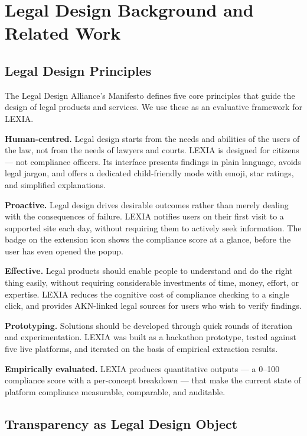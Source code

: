 \documentclass[12pt, a4paper]{article}
\begin{document}
\section{Legal Design Background and Related Work}

\subsection{Legal Design Principles}

The Legal Design Alliance's Manifesto \cite{lda2018} defines five core principles that guide the design of legal products and services. We use these as an evaluative framework for LEXIA.

\textbf{Human-centred.} Legal design starts from the needs and abilities of the users of the law, not from the needs of lawyers and courts. LEXIA is designed for citizens --- not compliance officers. Its interface presents findings in plain language, avoids legal jargon, and offers a dedicated child-friendly mode with emoji, star ratings, and simplified explanations.

\textbf{Proactive.} Legal design drives desirable outcomes rather than merely dealing with the consequences of failure. LEXIA notifies users on their first visit to a supported site each day, without requiring them to actively seek information. The badge on the extension icon shows the compliance score at a glance, before the user has even opened the popup.

\textbf{Effective.} Legal products should enable people to understand and do the right thing easily, without requiring considerable investments of time, money, effort, or expertise. LEXIA reduces the cognitive cost of compliance checking to a single click, and provides AKN-linked legal sources for users who wish to verify findings.

\textbf{Prototyping.} Solutions should be developed through quick rounds of iteration and experimentation. LEXIA was built as a hackathon prototype, tested against five live platforms, and iterated on the basis of empirical extraction results.

\textbf{Empirically evaluated.} LEXIA produces quantitative outputs --- a 0--100 compliance score with a per-concept breakdown --- that make the current state of platform compliance measurable, comparable, and auditable.

\subsection{Transparency as Legal Design Object}
\end{document}
